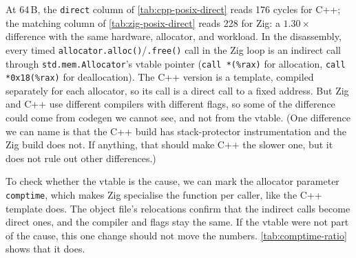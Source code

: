 \documentclass[12pt]{report}
\renewcommand{\_}{\origunderscore\allowbreak}
\begin{document}
At 64\,B, the \texttt{direct} column of \cref{tab:cpp-posix-direct} reads 176 cycles for C++; the matching column of \cref{tab:zig-posix-direct} reads 228 for Zig: a $1.30\times$ difference with the same hardware, allocator, and workload. In the disassembly, every timed \texttt{allocator.alloc()}\slash\texttt{.free()} call in the Zig loop is an indirect call through \texttt{std.mem.Allocator}'s vtable pointer (\texttt{call *(\%rax)} for allocation, \texttt{call *0x18(\%rax)} for deallocation). The C++ version is a template, compiled separately for each allocator, so its call is a direct call to a fixed address. But Zig and C++ use different compilers with different flags, so some of the difference could come from codegen we cannot see, and not from the vtable. (One difference we can name is that the C++ build has stack-protector instrumentation and the Zig build does not. If anything, that should make C++ the slower one, but it does not rule out other differences.)

To check whether the vtable is the cause, we can mark the allocator parameter \texttt{comptime}, which makes Zig specialise the function per caller, like the C++ template does. The object file's relocations confirm that the indirect calls become direct ones, and the compiler and flags stay the same. If the vtable were not part of the cause, this one change should not move the numbers. \cref{tab:comptime-ratio} shows that it does.
\end{document}
